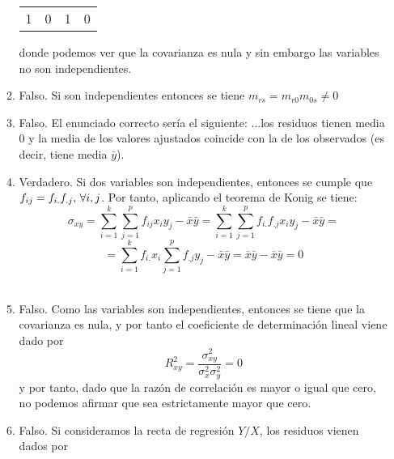 \documentclass[fleqn]{article}
\begin{document}
\begin{enumerate}
\begin{enumerate}
\begin{center}
\begin{tabular}{c|c c c}
                                                                1 & 0 & 1 & 0 \\
                                                        \end{tabular}
                                                \end{center}
                                                donde podemos ver que la covarianza es nula y sin embargo las variables no son independientes.\\
                                \item Falso. Si son independientes entonces se tiene $m_{rs} = m_{r0} m_{0s} \neq 0$\\
                                \item Falso. El enunciado correcto sería el siguiente: ...los residuos tienen media 0 y la media de los valores
                                                ajustados coincide con la de los observados (es decir, tiene media $\bar{y}$).\\
                                \item Verdadero. Si dos variables son independientes, entonces se cumple que $f_{ij} = f_{i.} f_{.j}, \thinspace \forall i, j$.
                                                Por tanto, aplicando el teorema de Konig se tiene:
                                                $$\sigma_{xy} = \sum_{i=1}^k \sum_{j=1}^p f_{ij} x_i y_j - \bar{x} \bar{y} = 
                                                \sum_{i=1}^k \sum_{j=1}^p f_{i.} f_{.j} x_i y_j - \bar{x} \bar{y} = $$
                                                $$= \sum_{i=1}^k f_{i.} x_i \sum_{j=1}^p f_{.j} y_j - \bar{x} \bar{y} = \bar{x} \bar{y} - \bar{x} \bar{y} = 0$$\\
                                \item Falso. Como las variables son independientes, entonces se tiene que la covarianza es nula, y por tanto el coeficiente
                                                de determinación lineal viene dado por 
                                                $$R^2_{xy} = \frac{\sigma_{xy}^2}{\sigma_x^2 \sigma_y^2} = 0$$
                                                y por tanto, dado que la razón de correlación es mayor o igual que cero, no podemos afirmar que sea estrictamente 
                                                mayor que cero.\\
                                \item Falso. Si consideramos la recta de regresión $Y/X$, los residuos vienen dados por

\end{enumerate}
\end{enumerate}
\end{document}
